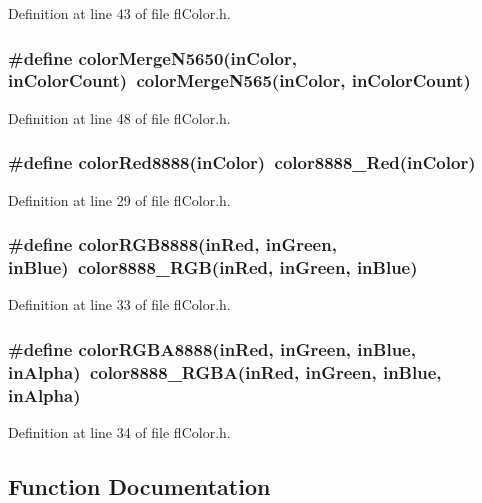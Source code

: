 Definition at line 43 of file fl\-Color.h.
\subsubsection{\setlength{\rightskip}{0pt plus 5cm}\#define color\-Merge\-N5650(in\-Color, in\-Color\-Count)~color\-Merge\-N565(in\-Color, in\-Color\-Count)}\label{flColor_8h_6d282c1c2e8bb959636945e02a033d26}




Definition at line 48 of file fl\-Color.h.
\subsubsection{\setlength{\rightskip}{0pt plus 5cm}\#define color\-Red8888(in\-Color)~color8888\_\-Red(in\-Color)}\label{flColor_8h_78601b4984dfb423d4a73d2158c2e785}




Definition at line 29 of file fl\-Color.h.
\subsubsection{\setlength{\rightskip}{0pt plus 5cm}\#define color\-RGB8888(in\-Red, in\-Green, in\-Blue)~color8888\_\-RGB(in\-Red, in\-Green, in\-Blue)}\label{flColor_8h_7fbc854ffb17e7c4a7f8c7e838da8f76}




Definition at line 33 of file fl\-Color.h.
\subsubsection{\setlength{\rightskip}{0pt plus 5cm}\#define color\-RGBA8888(in\-Red, in\-Green, in\-Blue, in\-Alpha)~color8888\_\-RGBA(in\-Red, in\-Green, in\-Blue, in\-Alpha)}\label{flColor_8h_d663d33dc27f0b3c5f6b7ed9e0c3928e}




Definition at line 34 of file fl\-Color.h.

\subsection{Function Documentation}
